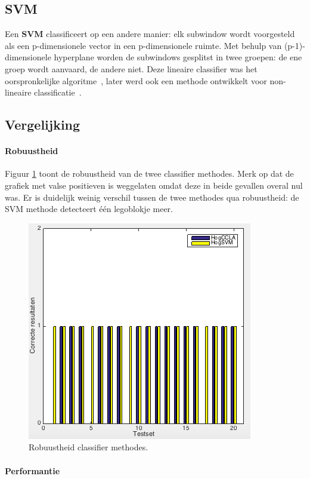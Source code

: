 \subsection{SVM} \label{sec:class_svm}
Een \textbf{SVM} classificeert op een andere manier: elk subwindow wordt voorgesteld als een p-dimensionele vector in een p-dimensionele ruimte. Met behulp van (p-1)-dimensionele hyperplane worden de subwindows gesplitst in twee groepen: de ene groep wordt aanvaard, de andere niet. Deze lineaire classifier was het oorspronkelijke algoritme~\cite{vapnik1963pattern}, later werd ook een methode ontwikkelt voor non-lineaire classificatie~\cite{boser1992training}.

\subsection{Vergelijking}

\paragraph{Robuustheid}

Figuur \ref{fig:classRobuust} toont de robuustheid van de twee classifier methodes. Merk op dat de grafiek met valse positieven is weggelaten omdat deze in beide gevallen overal nul was. Er is duidelijk weinig verschil tussen de twee methodes qua robuustheid:  de SVM methode detecteert \'e\'en legoblokje meer.

\begin{figure}
  \centering
  \includegraphics[width=0.5\linewidth]{img/ClassRobust}
  \caption{Robuustheid classifier methodes.}
  \label{fig:classRobuust}
\end{figure}

\paragraph{Performantie}

